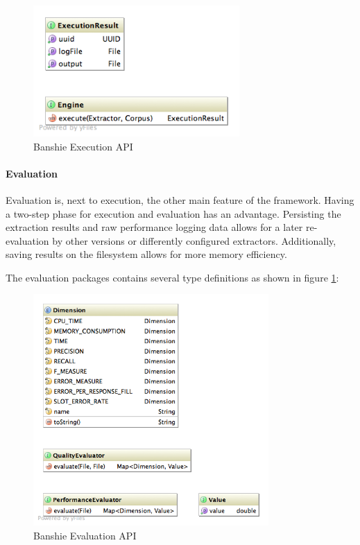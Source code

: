 \begin{figure}[H]
\centering
\includegraphics[width=0.7\textwidth, trim=20px 20px 0 0, clip=true]{api-execution.png}
\caption{Banshie Execution API}
\end{figure}

\newpage
\paragraph{Evaluation}
Evaluation is, next to execution, the other main feature of the framework. Having a two-step phase for execution and evaluation has an advantage. Persisting the extraction results and raw performance logging data allows for a later re-evaluation by other versions or differently configured extractors. Additionally, saving results on the filesystem allows for more memory efficiency.

The evaluation packages contains several type definitions as shown in figure \ref{fig:evaluation-api}:

\begin{figure}[H]
\centering
\includegraphics[width=0.8\textwidth, trim=20px 19px 0 0, clip=true]{api-evaluation.png}
\caption{Banshie Evaluation API}
\label{fig:evaluation-api}
\end{figure}

